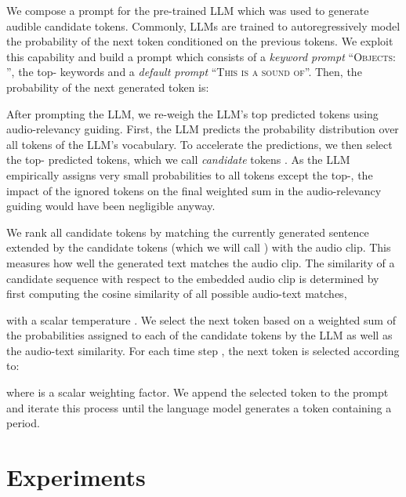 \documentclass{article}
\newcommand{\mypara}[1]{\vspace{2pt}\noindent{\bf{#1}}}
\begin{document}
We compose a prompt for the pre-trained LLM which was used to generate audible candidate tokens.
Commonly, LLMs are trained to autoregressively model the probability of the next token conditioned on the previous tokens.
We exploit this capability and build a prompt which
consists of a \emph{keyword prompt} \enquote{\textsc{Objects: }}, the top- keywords  and a \emph{default prompt} \enquote{\textsc{This is a sound of}}.
Then, the probability of the next generated token is:



\mypara{Audio-relevancy guiding.}
After prompting the LLM, we re-weigh the LLM's top predicted tokens using audio-relevancy guiding. First, the LLM predicts the probability distribution over all tokens of the LLM's vocabulary. To accelerate the predictions, we then select the top- predicted tokens, which we call \emph{candidate} tokens . As the LLM empirically assigns very small probabilities to all tokens except the top-, the impact of the ignored tokens on the final weighted sum in the audio-relevancy guiding would have been negligible anyway.

We rank all candidate tokens  by matching the currently generated sentence extended by the candidate tokens (which we will call ) with the audio clip. This measures how well the generated text matches the audio clip.
The similarity  of a candidate sequence  with respect to the embedded audio clip  is determined by first computing the cosine similarity  of all possible audio-text matches,

with a scalar temperature .
We select the next token based on a weighted sum of the probabilities assigned to each of the candidate tokens by the LLM as well as the audio-text similarity.
For each time step , the next token  is selected according to:

where  is a scalar weighting factor.
We append the selected token to the prompt and iterate this process until the language model generates a token containing a period.




\section{Experiments}
\end{document}

